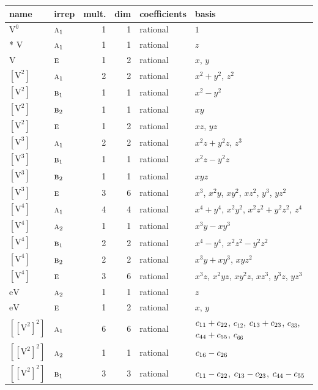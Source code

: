 \documentclass[10pt,a4paper]{article}
\numberwithin{equation}{section}
\newcommand{\irr}[1]{\text{\normalfont\scshape #1}}
\newcommand{\jahn}[1]{\mathrm{#1}}
\newlength{\fillwidth}\newlength{\cellwidth}\newlength{\colwidth}
\newcommand{\signbreak}{\penalty100\relax}
\begin{document}
{\begin{longtable}{@{}llrrl>{\RaggedRight\arraybackslash}p{\fillwidth}@{}}
name & irrep & mult. & dim & coefficients & basis\\\midrule\endhead
\bottomrule\endfoot\endlastfoot
$\jahn{V^{0}}$ & $\irr{a}_{1}$ & 1 & 1 & rational & $1$\\*
$\jahn{V}$ & $\irr{a}_{1}$ & 1 & 1 & rational & $z$\\
$\jahn{V}$ & $\irr{e}$ & 1 & 2 & rational & $x$, $y$\\
$\jahn{[V^{2}]}$ & $\irr{a}_{1}$ & 2 & 2 & rational & $x^{2} + y^{2}$, $z^{2}$\\
$\jahn{[V^{2}]}$ & $\irr{b}_{1}$ & 1 & 1 & rational & $x^{2} - y^{2}$\\
$\jahn{[V^{2}]}$ & $\irr{b}_{2}$ & 1 & 1 & rational & $xy$\\
$\jahn{[V^{2}]}$ & $\irr{e}$ & 1 & 2 & rational & $xz$, $yz$\\
$\jahn{[V^{3}]}$ & $\irr{a}_{1}$ & 2 & 2 & rational & $x^{2}z + y^{2}z$, $z^{3}$\\
$\jahn{[V^{3}]}$ & $\irr{b}_{1}$ & 1 & 1 & rational & $x^{2}z - y^{2}z$\\
$\jahn{[V^{3}]}$ & $\irr{b}_{2}$ & 1 & 1 & rational & $xyz$\\
$\jahn{[V^{3}]}$ & $\irr{e}$ & 3 & 6 & rational & $x^{3}$, $x^{2}y$, $xy^{2}$, $xz^{2}$, $y^{3}$, $yz^{2}$\\
$\jahn{[V^{4}]}$ & $\irr{a}_{1}$ & 4 & 4 & rational & $x^{4} + y^{4}$, $x^{2}y^{2}$, $x^{2}z^{2} + y^{2}z^{2}$, $z^{4}$\\
$\jahn{[V^{4}]}$ & $\irr{a}_{2}$ & 1 & 1 & rational & $x^{3}y - xy^{3}$\\
$\jahn{[V^{4}]}$ & $\irr{b}_{1}$ & 2 & 2 & rational & $x^{4} - y^{4}$, $x^{2}z^{2} - y^{2}z^{2}$\\
$\jahn{[V^{4}]}$ & $\irr{b}_{2}$ & 2 & 2 & rational & $x^{3}y + xy^{3}$, $xyz^{2}$\\
$\jahn{[V^{4}]}$ & $\irr{e}$ & 3 & 6 & rational & $x^{3}z$, $x^{2}yz$, $xy^{2}z$, $xz^{3}$, $y^{3}z$, $yz^{3}$\\
$\jahn{eV}$ & $\irr{a}_{2}$ & 1 & 1 & rational & $z$\\
$\jahn{eV}$ & $\irr{e}$ & 1 & 2 & rational & $x$, $y$\\
$\jahn{[[V^{2}]^{2}]}$ & $\irr{a}_{1}$ & 6 & 6 & rational & $c_{11} +\signbreak c_{22}$, $c_{12}$, $c_{13} +\signbreak c_{23}$, $c_{33}$, $c_{44} +\signbreak c_{55}$, $c_{66}$\\
$\jahn{[[V^{2}]^{2}]}$ & $\irr{a}_{2}$ & 1 & 1 & rational & $c_{16} -\signbreak c_{26}$\\
$\jahn{[[V^{2}]^{2}]}$ & $\irr{b}_{1}$ & 3 & 3 & rational & $c_{11} -\signbreak c_{22}$, $c_{13} -\signbreak c_{23}$, $c_{44} -\signbreak c_{55}$\\

\end{longtable}}
\end{document}
